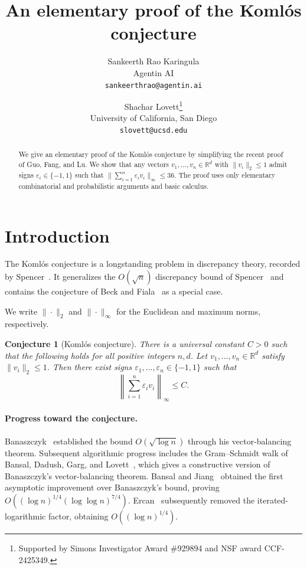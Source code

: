 \documentclass{article}
\title{An elementary proof of the Koml\'os conjecture}
\author{
Sankeerth Rao Karingula\\
{Agentin AI}\\
{\texttt{sankeerthrao@agentin.ai}}
\and
Shachar Lovett\thanks{Supported by Simons Investigator Award \#929894 and NSF award CCF-2425349.}\\
{University of California, San Diego}\\
{\texttt{slovett@ucsd.edu}}
}
\newtheorem{conjecture}[theorem]{Conjecture}
\newcommand{\R}{\mathbb{R}}
\newcommand{\eps}{\varepsilon}
\newcommand{\norm}[1]{\left \| #1 \right \|}
\begin{document}
\maketitle

\begin{abstract}
We give an elementary proof of the Koml\'os conjecture by simplifying
the recent proof of Guo, Fang, and Lu.
We show that any vectors $v_1,\ldots,v_n\in\mathbb{R}^d$ with
$\|v_i\|_2\le1$ admit signs $\varepsilon_i\in\{-1,1\}$ such that
$\|\sum_{i=1}^n\varepsilon_i v_i\|_\infty\le36$.
The proof uses only elementary combinatorial and probabilistic
arguments and basic calculus.
\end{abstract}

\section{Introduction}

The Koml\'os conjecture is a longstanding problem in discrepancy
theory, recorded by Spencer~\cite{spencer1987ten}.
It generalizes the $O(\sqrt{n})$ discrepancy bound of
Spencer~\cite{spencer1985six} and contains the conjecture of
Beck and Fiala~\cite{beck1981integer} as a special case.

We write $\|\cdot\|_2$ and $\|\cdot\|_\infty$ for the Euclidean
and maximum norms, respectively.

\begin{conjecture}[Koml\'os conjecture]
There is a universal constant $C>0$ such that the following holds
for all positive integers $n,d$.
Let $v_1,\ldots,v_n \in \R^d$ satisfy $\|v_i\|_2 \le 1$.
Then there exist signs $\eps_1,\ldots,\eps_n \in \{-1,1\}$ such that
\[
\norm{\sum_{i=1}^n \eps_i v_i}_{\infty} \le C.
\]
\end{conjecture}

\paragraph{Progress toward the conjecture.}
Banaszczyk~\cite{banaszczyk1998balancing} established the bound
$O(\sqrt{\log n})$ through his vector-balancing theorem.
Subsequent algorithmic progress includes the Gram--Schmidt walk
of Bansal, Dadush, Garg, and Lovett~\cite{bansal2018gram},
which gives a constructive version of Banaszczyk's
vector-balancing theorem.
Bansal and Jiang~\cite{bansal2026decoupling,bansal2026exposition}
obtained the first asymptotic improvement over
Banaszczyk's bound, proving
$O((\log n)^{1/4}(\log\log n)^{7/4})$.
Ercan~\cite{ercan2026log} subsequently removed the iterated-logarithmic
factor, obtaining $O((\log n)^{1/4})$.
\end{document}

